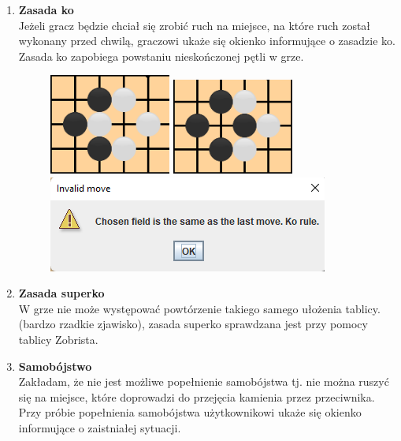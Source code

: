 \documentclass{article}
\begin{document}
\begin{enumerate}
          \newpage


    \item  \textbf{Zasada ko} \\
          Jeżeli gracz będzie chciał się zrobić ruch na miejsce, na które ruch
          został wykonany przed chwilą, graczowi ukaże się okienko informujące o
          zasadzie ko. Zasada ko zapobiega powstaniu nieskończonej pętli w grze.

          \begin{figure}[H]
              \centering%
              \begin{minipage}{.48\textwidth}%
                  \centering
                  \includegraphics[width=4cm]{imgs/ko_rule1.png}
                  \centering
                  \includegraphics[width=4cm]{imgs/ko_rule2.png}
                  \centering
                  \includegraphics{imgs/ko_rule_warning.png}
                  \centering
              \end{minipage}%
          \end{figure}
    \item \textbf{Zasada superko}\\
          W grze nie może występować powtórzenie takiego samego ułożenia tablicy. (bardzo
          rzadkie zjawisko), zasada superko sprawdzana jest przy pomocy tablicy
          Zobrista.
          \newpage
    \item \textbf{Samobójstwo}\\
          Zakładam, że nie jest możliwe popełnienie samobójstwa tj. nie można
          ruszyć się na miejsce, które doprowadzi do przejęcia kamienia
          przez przeciwnika. Przy próbie popełnienia samobójstwa użytkownikowi
          ukaże się okienko informujące o zaistniałej sytuacji.


\end{enumerate}
\end{document}
